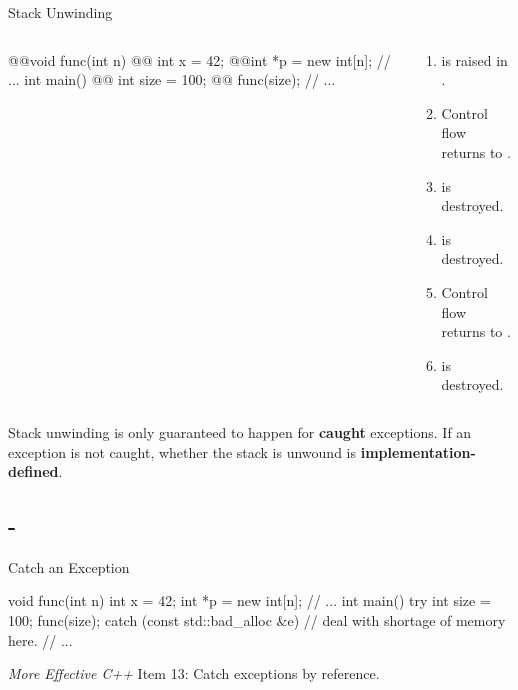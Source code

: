 \documentclass{beamer}
\newcommand{\Highlight}{\makebox[0pt][l]{\color{pink}\rule[-4pt]{\textwidth}{11pt}}}
\begin{document}
\begin{frame}[fragile]{Stack Unwinding}
  \begin{columns}
    \begin{column}{0.4\linewidth}
      \begin{cpp}
@\onslide<4>{\Highlight}@void func(int n) {
@\onslide<3>{\Highlight}@  int x = 42;
@\onslide<1,2>{\Highlight}@int *p = new int[n];
  // ...
}
int main() {
@\onslide<6>{\Highlight}@  int size = 100;
@\onslide<5>{\Highlight}@  func(size);
  // ...
}
      \end{cpp}
    \end{column}
    \begin{column}{0.6\linewidth}
      \begin{enumerate}
        \item {} is raised in \ttt{[]}.
        \item Control flow returns to .
        \item {} is destroyed.
        \item {} is destroyed.
        \item Control flow returns to .
        \item {} is destroyed.
      \end{enumerate}
    \end{column}
  \end{columns}
  \begin{notice}
    Stack unwinding is only guaranteed to happen for \textbf{caught} exceptions. If an exception is not caught, whether the stack is unwound is \textbf{implementation-defined}.
  \end{notice}
\end{frame}

\subsection{-}

\begin{frame}[fragile]{Catch an Exception}
  \begin{cpp}
void func(int n) {
  int x = 42;
  int *p = new int[n];
  // ...
}
int main() {
  try {
    int size = 100;
    func(size);
  } catch (const std::bad_alloc &e) {
    // deal with shortage of memory here.
  }
  // ...
}
  \end{cpp}
  \textit{More Effective C++} Item 13: Catch exceptions by reference.
\end{frame}
\end{document}
